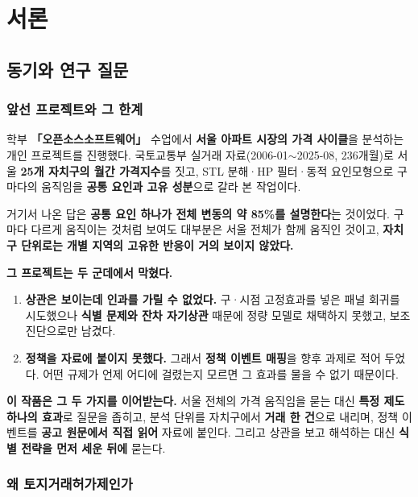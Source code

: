 
\section{서론}

\subsection{동기와 연구 질문}

\subsubsection*{앞선 프로젝트와 그 한계}

학부 \textbf{「오픈소스소프트웨어」} 수업에서 \textbf{서울 아파트 시장의 가격
사이클}을 분석하는 개인 프로젝트를 진행했다\citep{prior2025}. 국토교통부 실거래
자료(2006-01$\sim$2025-08, 236개월)로 서울 \textbf{25개 자치구의 월간 가격지수}를
짓고, STL 분해·HP 필터·동적 요인모형으로 구마다의 움직임을 \textbf{공통 요인과
고유 성분}으로 갈라 본 작업이다.

거기서 나온 답은 \textbf{공통 요인 하나가 전체 변동의 약 85\%를 설명한다}는
것이었다. 구마다 다르게 움직이는 것처럼 보여도 대부분은 서울 전체가 함께 움직인
것이고, \textbf{자치구 단위로는 개별 지역의 고유한 반응이 거의 보이지 않았다.}

\textbf{그 프로젝트는 두 군데에서 막혔다.}

\begin{enumerate}[leftmargin=2em, itemsep=3pt]
  \item \textbf{상관은 보이는데 인과를 가릴 수 없었다.} 구·시점 고정효과를 넣은
        패널 회귀를 시도했으나 \textbf{식별 문제와 잔차 자기상관} 때문에 정량
        모델로 채택하지 못했고, 보조 진단으로만 남겼다.
  \item \textbf{정책을 자료에 붙이지 못했다.} 그래서 \textbf{정책 이벤트 매핑}을
        향후 과제로 적어 두었다. 어떤 규제가 언제 어디에 걸렸는지 모르면 그
        효과를 물을 수 없기 때문이다.
\end{enumerate}

\textbf{이 작품은 그 두 가지를 이어받는다.} 서울 전체의 가격 움직임을 묻는 대신
\textbf{특정 제도 하나의 효과}로 질문을 좁히고, 분석 단위를 자치구에서 \textbf{거래
한 건}으로 내리며, 정책 이벤트를 \textbf{공고 원문에서 직접 읽어} 자료에 붙인다.
그리고 상관을 보고 해석하는 대신 \textbf{식별 전략을 먼저 세운 뒤에} 묻는다.

\subsubsection*{왜 토지거래허가제인가}

